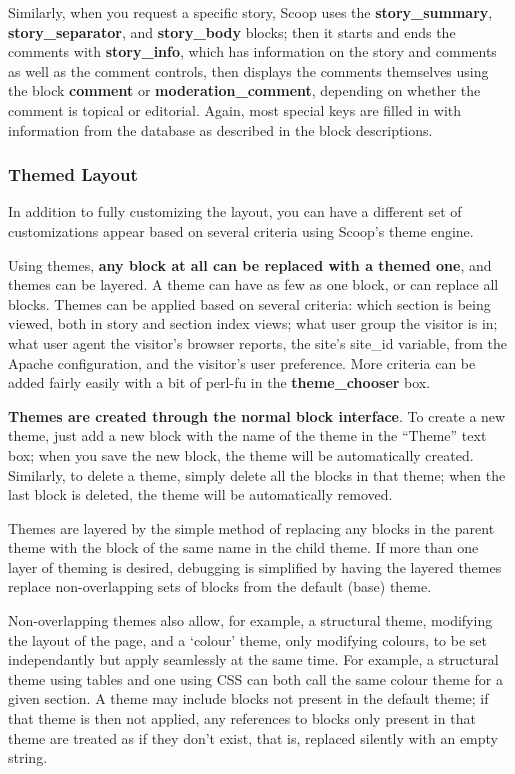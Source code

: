 Similarly, when you request a specific story, Scoop uses the {\bf story\_summary}, {\bf story\_separator}, and {\bf story\_body} blocks; then it starts and ends the comments with {\bf story\_info}, which has information on the story and comments as well as the comment controls, then displays the comments themselves using the block {\bf comment} or {\bf moderation\_comment}, depending on whether the comment is topical or editorial.  Again, most special keys are filled in with information from the database as described in the block descriptions.

\subsubsection{Themed Layout}
\label{blocks-themes}

In addition to fully customizing the layout, you can have a different set of customizations appear based on several criteria using Scoop's theme engine.

Using themes, {\bf any block at all can be replaced with a themed one}, and themes can be layered.  A theme can have as few as one block, or can replace all blocks.  Themes can be applied based on several criteria: which section is being viewed, both in story and section index views; what user group the visitor is in; what user agent the visitor's browser reports, the site's site\_id variable, from the Apache configuration, and the visitor's user preference.  More criteria can be added fairly easily with a bit of perl-fu in the {\bf theme\_chooser} box.

{\bf Themes are created through the normal block interface}.  To create a new theme, just add a new block with the name of the theme in the ``Theme'' text box; when you save the new block, the theme will be automatically created.  Similarly, to delete a theme, simply delete all the blocks in that theme; when the last block is deleted, the theme will be automatically removed.

Themes are layered by the simple method of replacing any blocks in the parent theme with the block of the same name in the child theme.  If more than one layer of theming is desired, debugging is simplified by having the layered themes replace non-overlapping sets of blocks from the default (base) theme.  

Non-overlapping themes also allow, for example, a structural theme, modifying the layout of the page, and a `colour' theme, only modifying colours, to be set independantly but apply seamlessly at the same time.  For example, a structural theme using tables and one using CSS can both call the same colour theme for a given section.  A theme may include blocks not present in the default theme; if that theme is then not applied, any references to blocks only present in that theme are treated as if they don't exist, that is, replaced silently with an empty string.

